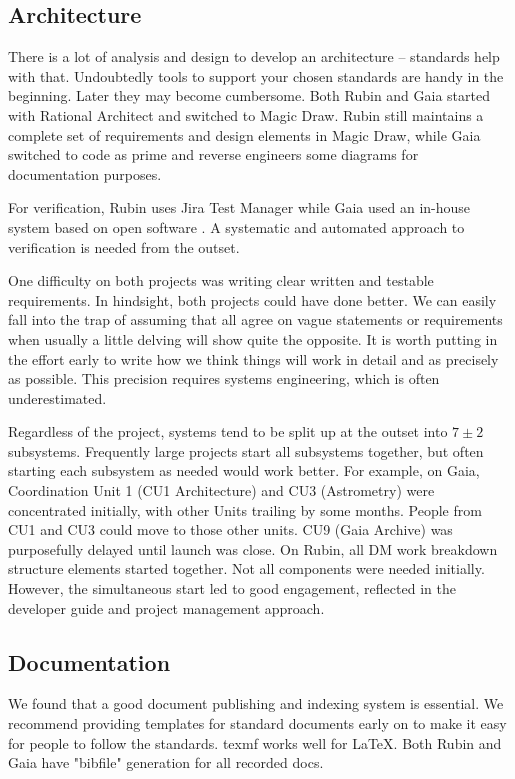 \documentclass[11pt,twoside]{article}
\begin{document}
\subsection{Architecture}
There is a lot of analysis and design to develop an architecture -- standards help with that.
Undoubtedly tools to support your chosen standards are handy in the beginning. Later they may become cumbersome. Both Rubin and Gaia started with Rational Architect and switched to Magic Draw.
Rubin still maintains a complete set of requirements and design elements in Magic Draw, while Gaia switched to code as prime and reverse engineers some diagrams for documentation purposes.

For verification, Rubin uses Jira Test Manager \citep{2018SPIE10705E..0US} while Gaia used an in-house system based on open software \citep{2012SPIE.8449E..0GC}.
A systematic and automated approach to verification is needed from the outset.

One difficulty on both projects was writing clear written and testable requirements. In hindsight, both projects could have done better.
We can easily fall into the trap of assuming that all agree on vague statements or requirements when usually a little delving will show quite the opposite.
It is worth putting in the effort early to write how we think things will work in detail and as precisely as possible.
This precision requires systems engineering, which is often underestimated.


Regardless of the project, systems tend to be split up at the outset into  $7 \pm 2$ subsystems.
Frequently large projects start all subsystems together, but often starting each subsystem as needed would work better.
For example, on Gaia, Coordination Unit 1 (CU1 Architecture) and CU3 (Astrometry) were concentrated initially, with other Units trailing by some months.
People from CU1 and CU3 could move to those other units.
CU9 (Gaia Archive) was purposefully delayed until launch was close.
On Rubin, all DM work breakdown structure elements started together.
Not all components were needed initially.
However, the simultaneous start led to good engagement, reflected in the developer guide and project management approach.


\subsection{Documentation}
We found that a good document publishing and indexing system is essential.
We recommend providing templates for standard documents early on to make it easy for people to follow the standards. texmf works well for \LaTeX. Both Rubin and Gaia have "bibfile" generation for all recorded docs.
\end{document}
